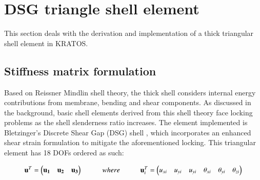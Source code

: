 





\setcounter{MaxMatrixCols}{20}




\chapter{DSG triangle shell element}
\label{chap:chapter_3}

\renewcommand{\Thema}{DSG triangle shell element}

This section deals with the derivation and implementation of a thick triangular shell element in KRATOS.

\section{Stiffness matrix formulation}

Based on Reissner Mindlin shell theory, the thick shell considers internal energy contributions from membrane, bending and shear components. As discussed in the background, basic shell elements derived from this shell theory face locking problems as the shell slenderness ratio increases. The element implemented is Bletzinger's Discrete Shear Gap (DSG) shell \cite{Ble00}, which incorporates an enhanced shear strain formulation to mitigate the aforementioned locking. This triangular element has 18 DOFs ordered as such:

\begin{equation} 
\mathbf{u}^T = 
\begin{pmatrix}
\mathbf{u_1} & \mathbf{u_2} & \mathbf{u_3}
\end{pmatrix} 
\hspace{10mm}
where
\hspace{10mm}
\mathbf{u}_i^T = 
\begin{pmatrix}
{u_{xi}} & {u_{yi}} & {u_{yi}} & {\theta_{xi}} & {\theta_{yi}} & {\theta_{zi}}
\end{pmatrix}
\label{eqt1}
\end{equation}

